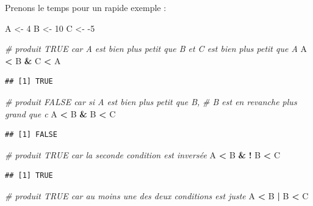 \documentclass[
  11pt,
  french,
]{book}
\makeatletter
\newenvironment{Shaded}{\begin{snugshade}}{\end{snugshade}}
\newcommand{\CommentTok}[1]{\textcolor[rgb]{0.56,0.35,0.01}{\textit{#1}}}
\newcommand{\DecValTok}[1]{\textcolor[rgb]{0.00,0.00,0.81}{#1}}
\newcommand{\NormalTok}[1]{#1}
\newcommand{\OperatorTok}[1]{\textcolor[rgb]{0.81,0.36,0.00}{\textbf{#1}}}
\newcommand{\StringTok}[1]{\textcolor[rgb]{0.31,0.60,0.02}{#1}}
\newenvironment{kframe}{%
\medskip{}
\setlength{\fboxsep}{.8em}
 \def\at@end@of@kframe{}%
 \ifinner\ifhmode%
  \def\at@end@of@kframe{\end{minipage}}%
  \begin{minipage}{\columnwidth}%
 \fi\fi%
 \def\FrameCommand##1{\hskip\@totalleftmargin \hskip-\fboxsep
 \colorbox{shadecolor}{##1}\hskip-\fboxsep
     \hskip-\linewidth \hskip-\@totalleftmargin \hskip\columnwidth}%
 \MakeFramed {\advance\hsize-\width
   \@totalleftmargin\z@ \linewidth\hsize
   \@setminipage}}%
 {\par\unskip\endMakeFramed%
 \at@end@of@kframe}
\renewenvironment{Shaded}{\begin{kframe}}{\end{kframe}}
\makeatother
\begin{document}
Prenons le temps pour un rapide exemple :

\begin{Shaded}
\begin{Highlighting}[]
\NormalTok{A <-}\StringTok{ }\DecValTok{4} 
\NormalTok{B <-}\StringTok{ }\DecValTok{10}
\NormalTok{C <-}\StringTok{ }\DecValTok{-5}

\CommentTok{# produit TRUE car A est bien plus petit que B et C est bien plus petit que A}
\NormalTok{A }\OperatorTok{<}\StringTok{ }\NormalTok{B }\OperatorTok{&}\StringTok{ }\NormalTok{C }\OperatorTok{<}\StringTok{ }\NormalTok{A}
\end{Highlighting}
\end{Shaded}

\begin{verbatim}
## [1] TRUE
\end{verbatim}

\begin{Shaded}
\begin{Highlighting}[]
\CommentTok{# produit FALSE car si A est bien plus petit que B, }
\CommentTok{# B est en revanche plus grand que c}
\NormalTok{A }\OperatorTok{<}\StringTok{ }\NormalTok{B }\OperatorTok{&}\StringTok{ }\NormalTok{B }\OperatorTok{<}\StringTok{ }\NormalTok{C}
\end{Highlighting}
\end{Shaded}

\begin{verbatim}
## [1] FALSE
\end{verbatim}

\begin{Shaded}
\begin{Highlighting}[]
\CommentTok{# produit TRUE car la seconde condition est inversée}
\NormalTok{A }\OperatorTok{<}\StringTok{ }\NormalTok{B }\OperatorTok{&}\StringTok{  }\OperatorTok{!}\StringTok{ }\NormalTok{B }\OperatorTok{<}\StringTok{ }\NormalTok{C}
\end{Highlighting}
\end{Shaded}

\begin{verbatim}
## [1] TRUE
\end{verbatim}

\begin{Shaded}
\begin{Highlighting}[]
\CommentTok{# produit TRUE car au moins une des deux conditions est juste}
\NormalTok{A }\OperatorTok{<}\StringTok{ }\NormalTok{B }\OperatorTok{|}\StringTok{  }\NormalTok{B }\OperatorTok{<}\StringTok{ }\NormalTok{C}
\end{Highlighting}
\end{Shaded}
\end{document}
